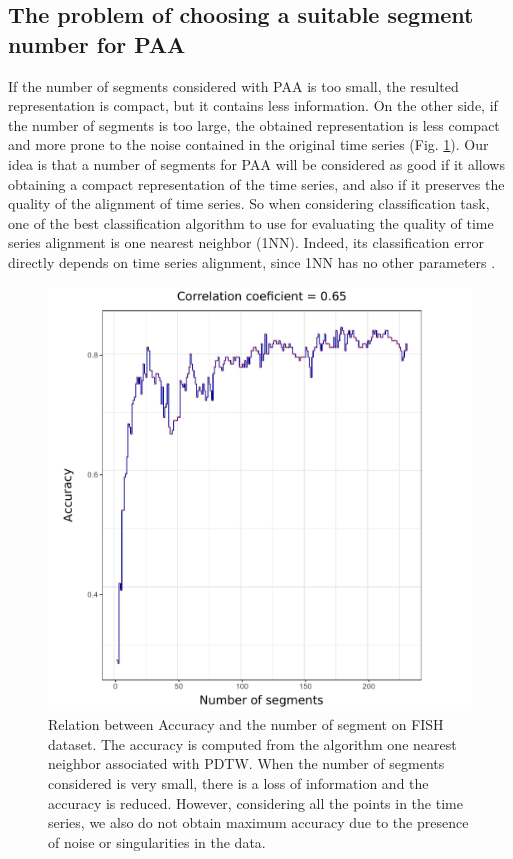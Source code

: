 \subsection{The problem of choosing a suitable segment number for PAA}

If the number of segments considered with PAA is too small, the resulted
representation  is compact, but it contains less information. On the other side, if the number of
segments is too large, the obtained representation  is less compact and more prone to the noise
contained in the original time series (Fig. \ref{relation_nb_acc}). Our idea is that a number of
segments for PAA will be considered as good if it allows obtaining a compact representation of the
time series, and also if it preserves the quality of the alignment of time series. So when
considering classification task, one of the best classification algorithm to use for
evaluating the quality of time series alignment is one nearest neighbor (1NN).   
Indeed, its classification error directly depends on time series alignment, since 1NN has no other
parameters \cite{wang2013experimental}.


\begin{figure}[h]
\center
\includegraphics[scale = 0.4]{images/effets_de_n_sur_accuracy}
\caption{Relation between Accuracy and the number of segment on FISH dataset. The accuracy is computed from the algorithm one nearest neighbor associated with PDTW. When the number of segments
considered is very small, there is a loss of information and the accuracy is reduced. However, considering all the points in the time series, we also do not obtain maximum accuracy due to the presence of noise or singularities \cite{KeoghPazzani2001}  in the data. }
\label{relation_nb_acc}
\end{figure}


